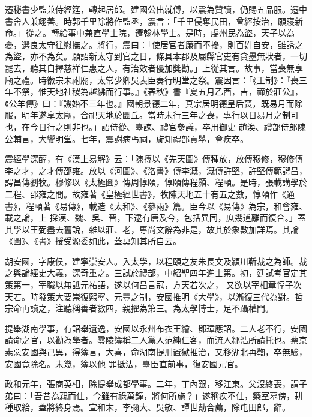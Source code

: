 \begin{pinyinscope}
 遷秘書少監兼侍經筵，轉起居郎。建國公出就傅，以震為贊讀，仍賜五品服。遷中書舍人兼翊善。時郭千里除將作監丞，震言：「千里侵奪民田，曾經按治，願寢新命。」從之。轉給事中兼直學士院，遷翰林學士。是時，虔州民為盜，天子以為憂，選良太守往慰撫之。將行，震曰：「使居官者廉而不擾，則百姓自安，雖誘之為盜，亦不為矣。願詔新太守到官之日，條具本郡及屬縣官吏有貪墨無狀者，一切
 罷去，聽其自擇慈祥仁惠之人，有治效者優加獎勸。」上從其言。故事，當喪無享廟之禮。時徽宗未祔廟，太常少卿吳表臣奏行明堂之祭。震因言：「《王制》：『喪三年不祭，惟天地社稷為越紼而行事。』《春秋》書『夏五月乙酉，吉，禘於莊公』，《公羊傳》曰：『譏始不三年也。』國朝景德二年，真宗居明德皇后喪，既易月而除服，明年遂享太廟，合祀天地於圜丘。當時未行三年之喪，專行以日易月之制可也，在今日行之則非也。」詔侍從、臺諫、禮官參議，卒用御史
 趙渙、禮部侍郎陳公輔言，大饗明堂。七年，震謝病丐祠，旋知禮部貢舉，會疾卒。



 震經學深醇，有《漢上易解》云：「陳摶以《先天圖》傳種放，放傳穆修，穆修傳李之才，之才傳邵雍。放以《河圖》、《洛書》傳李溉，溉傳許堅，許堅傳範諤昌，諤昌傳劉牧。穆修以《太極圖》傳周惇頤，惇頤傳程顥、程頤。是時，張載講學於二程、邵雍之間。故雍著《皇極經世書》，牧陳天地五十有五之數，惇頤作《通書》，程頤著《易傳》，載造《太和》、《參兩》篇。臣今以《易傳》為宗，和會雍、載之論，上
 採漢、魏、吳、晉，下逮有唐及今，包括異同，庶幾道離而復合。」蓋其學以王弼盡去舊說，雜以莊、老，專尚文辭為非是，故其於象數加詳焉。其論《圖》、《書》授受源委如此，蓋莫知其所自云。



 胡安國，字康侯，建寧崇安人。入太學，以程頤之友朱長文及潁川靳裁之為師。裁之與論經史大義，深奇重之。三試於禮部，中紹聖四年進士第。初，廷試考官定其策第一，宰職以無詆元祐語，遂以何昌言冠，方天若次之，
 又欲以宰相章惇子次天若。時發策大要崇復熙寧、元豐之制，安國推明《大學》，以漸復三代為對。哲宗命再讀之，注聽稱善者數四，親擢為第三。為太學博士，足不躡權門。



 提舉湖南學事，有詔舉遺逸，安國以永州布衣王繪、鄧璋應詔。二人老不行，安國請命之官，以勸為學者。零陵簿稱二人黨人范純仁客，而流人鄒浩所請托也。蔡京素惡安國與己異，得簿言，大喜，命湖南提刑置獄推治，又移湖北再鞫，卒無驗，安國竟除名。未幾，簿以他
 罪抵法，臺臣直前事，復安國元官。



 政和元年，張商英相，除提舉成都學事。二年，丁內艱，移江東。父沒終喪，謂子弟曰：「吾昔為親而仕，今雖有祿萬鐘，將何所施？」遂稱疾不仕，築室墓傍，耕種取給，蓋將終身焉。宣和末，李彌大、吳敏、譚世勣合薦，除屯田郎，辭。




\end{pinyinscope}
